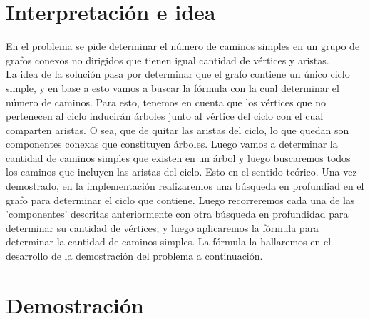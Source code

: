 \documentclass[12pt]{article}
\begin{document}
\section{Interpretación e idea} 

En el problema se pide determinar el n\'umero de caminos simples en un grupo de grafos conexos no dirigidos que tienen igual cantidad de v\'ertices y aristas.\\

La idea de la soluci\'on pasa por determinar que el grafo contiene un \'unico ciclo simple, y en base a esto vamos a buscar la f\'ormula con 
la cual determinar el n\'umero de caminos. Para esto, tenemos en cuenta que los v\'ertices que no pertenecen al ciclo inducir\'an \'arboles 
junto al v\'ertice del ciclo con el cual comparten aristas. O sea, que de quitar las aristas del ciclo, lo que quedan son componentes conexas que constituyen \'arboles. Luego vamos a determinar la cantidad de caminos simples que existen en un \'arbol y luego buscaremos todos los 
caminos que incluyen las aristas del ciclo. Esto en el sentido te\'orico. Una vez demostrado, en la implementaci\'on realizaremos una 
b\'usqueda en profundiad en el grafo para determinar el ciclo que contiene. Luego recorreremos cada una de las 'componentes' descritas anteriormente con otra b\'usqueda en profundidad para determinar su cantidad de v\'ertices; y luego aplicaremos la f\'ormula para determinar la cantidad de caminos simples. La f\'ormula la hallaremos en el desarrollo de la demostraci\'on del problema a continuaci\'on. 







\section{Demostración}
\end{document}
